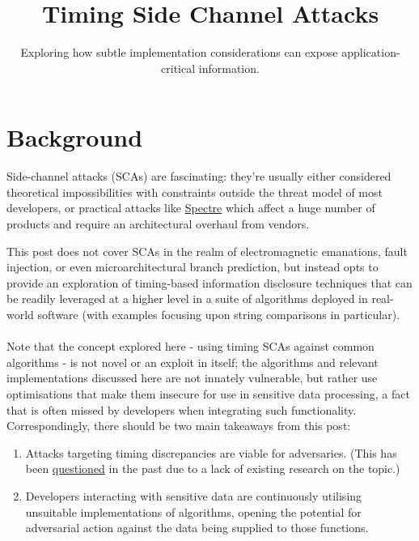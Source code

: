 \title{Timing Side Channel Attacks}
\subtitle{Exploring how subtle implementation considerations can expose application-critical information.}

\section{Background}

Side-channel attacks (SCAs) are fascinating: they're usually either considered theoretical impossibilities with constraints
			outside the threat
			model of most developers, or practical attacks like \href{https://arxiv.org/abs/1801.01203}{Spectre} which affect a huge number of products and
			require an architectural overhaul from vendors.

This post does not cover SCAs in the realm of electromagnetic emanations, fault injection, or even microarchitectural branch prediction,
			but instead opts to provide an exploration of timing-based information disclosure techniques that can be readily leveraged at a higher level in a suite
			of algorithms deployed in real-world software
			(with examples focusing upon string comparisons in particular).\\
\\

			Note that the concept explored here - using timing SCAs against common algorithms - is not novel or an exploit in itself; the algorithms
			and relevant implementations discussed here are not innately vulnerable, but rather use optimisations that make them insecure for use in sensitive data
			processing, a fact that is often missed by developers when integrating such functionality. Correspondingly, there should be two main takeaways from this post:

\begin{enumerate}
\item Attacks targeting timing discrepancies are viable for adversaries. (This has been
			\href{https://security.stackexchange.com/questions/50900/are-there-any-working-proof-of-concept-string-comparison-timing-attacks}{questioned}
			in the past due to a lack of existing research on the topic.)
\item Developers interacting with sensitive data are continuously utilising unsuitable implementations of algorithms, opening the potential for adversarial action against the data being supplied to those functions.
\end{enumerate}

